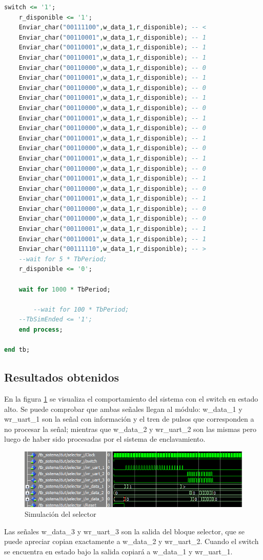 \begin{lstlisting}[language = vhdl,caption=Testbench del módulo selector,label={lst:test_selector}]
	switch <= '1';
	r_disponible <= '1';
	Enviar_char("00111100",w_data_1,r_disponible); -- < 	
	Enviar_char("00110001",w_data_1,r_disponible); -- 1 	
	Enviar_char("00110001",w_data_1,r_disponible); -- 1
 	Enviar_char("00110001",w_data_1,r_disponible); -- 1 	
	Enviar_char("00110000",w_data_1,r_disponible); -- 0
	Enviar_char("00110001",w_data_1,r_disponible); -- 1 	
	Enviar_char("00110000",w_data_1,r_disponible); -- 0
	Enviar_char("00110001",w_data_1,r_disponible); -- 1 	
	Enviar_char("00110000",w_data_1,r_disponible); -- 0
	Enviar_char("00110001",w_data_1,r_disponible); -- 1 	
	Enviar_char("00110000",w_data_1,r_disponible); -- 0
	Enviar_char("00110001",w_data_1,r_disponible); -- 1 	
	Enviar_char("00110000",w_data_1,r_disponible); -- 0
	Enviar_char("00110001",w_data_1,r_disponible); -- 1 	
	Enviar_char("00110000",w_data_1,r_disponible); -- 0
	Enviar_char("00110001",w_data_1,r_disponible); -- 1 	
	Enviar_char("00110000",w_data_1,r_disponible); -- 0
	Enviar_char("00110001",w_data_1,r_disponible); -- 1 	
	Enviar_char("00110000",w_data_1,r_disponible); -- 0
	Enviar_char("00110000",w_data_1,r_disponible); -- 0	
	Enviar_char("00110001",w_data_1,r_disponible); -- 1 
	Enviar_char("00110001",w_data_1,r_disponible); -- 1 	
	Enviar_char("00111110",w_data_1,r_disponible); -- >
	--wait for 5 * TbPeriod;
	r_disponible <= '0';
	
	wait for 1000 * TbPeriod;

        --wait for 100 * TbPeriod;
	--TbSimEnded <= '1';
    end process;
	
end tb;
		\end{lstlisting}
			
	\subsection{Resultados obtenidos}
				
		En la figura \ref{fig:Test_Selector} se visualiza el comportamiento del sistema con el switch en estado alto. Se puede comprobar que ambas señales llegan al módulo: w\_data\_1 y wr\_uart\_1 son la señal con información y el tren de pulsos que corresponden a no procesar la señal; mientras que w\_data\_2 y wr\_uart\_2 son las mismas pero luego de haber sido procesadas por el sistema de enclavamiento.
			
	\begin{figure}[h]
	\centering
	\includegraphics[scale=0.95]{./Figures/Test/Selector}
		\caption{Simulación del selector}
		\label{fig:Test_Selector}
	\end{figure}
	
	\vspace{5cm}
			
	Las señales w\_data\_3 y wr\_uart\_3 son la salida del bloque selector, que se puede apreciar copian exactamente a w\_data\_2 y wr\_uart\_2. Cuando el switch se encuentra en estado bajo la salida copiará a w\_data\_1 y wr\_uart\_1.
